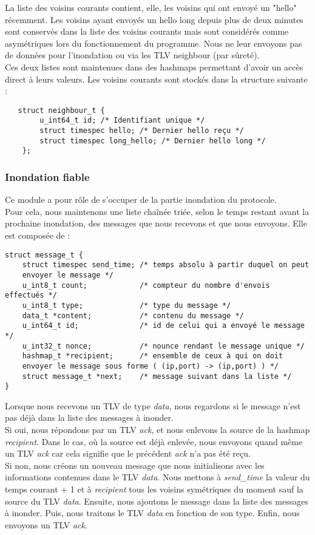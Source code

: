 \documentclass{FR16}
\begin{document}
La liste des voisins courants contient, elle, les voisins qui ont envoyé un "hello" récemment. Les voisins ayant envoyés un hello long depuis plus de deux minutes sont conservés dans la liste des voisins courants mais sont considérés comme asymétriques lors du fonctionnement du programme. Nous ne leur envoyons pas de données pour l'inondation ou via les TLV neighbour (par sûreté). \\

Ces deux listes sont maintenues dans des hashmaps permettant d'avoir un accès direct à leurs valeurs. Les voisins courants sont stockés dans la structure suivante : 
\begin{verbatim}
   struct neighbour_t {
        u_int64_t id; /* Identifiant unique */
        struct timespec hello; /* Dernier hello reçu */
        struct timespec long_hello; /* Dernier hello long */
    };
\end{verbatim} 

\subsubsection{Inondation fiable}
Ce module a pour rôle de s'occuper de la partie inondation du protocole.\\
Pour cela, nous maintenons une liste chaînée triée, selon le temps restant avant la prochaine inondation, des messages que nous recevons et que nous envoyons. Elle est composée de :
\begin{verbatim}
struct message_t {
    struct timespec send_time; /* temps absolu à partir duquel on peut 
    envoyer le message */
    u_int8_t count;            /* compteur du nombre d'envois effectués */
    u_int8_t type;             /* type du message */
    data_t *content;           /* contenu du message */
    u_int64_t id;              /* id de celui qui a envoyé le message */
    u_int32_t nonce;           /* nounce rendant le message unique */
    hashmap_t *recipient;      /* ensemble de ceux à qui on doit 
    envoyer le message sous forme ( (ip,port) -> (ip,port) ) */
    struct message_t *next;    /* message suivant dans la liste */
}
\end{verbatim}
Lorsque nous recevons un TLV de type \textit{data}, nous regardons si le message n'est pas déjà dans la liste des messages à inonder.\\
Si oui, nous répondons par un TLV \textit{ack}, et nous enlevons la source de la hashmap \textit{recipient}. Dans le cas, où la source est déjà enlevée, nous envoyons quand même un TLV \textit{ack} car cela signifie que le précédent \textit{ack} n'a pas été reçu.\\
Si non, nous créons un nouveau message que nous initialisons avec les informations contenues dans le TLV \textit{data}. Nous mettons à \textit{send\_time} la valeur du temps courant + 1 et à \textit{recipient} tous les voisins symétriques du moment sauf la source du TLV \textit{data}. Ensuite, nous ajoutons le message dans la liste des messages à inonder. Puis, nous traitons le TLV \textit{data} en fonction de son type. Enfin, nous envoyons un TLV \textit{ack}.\\
\end{document}
